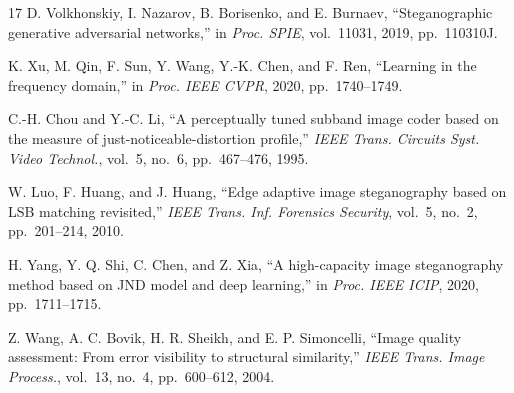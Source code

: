 \documentclass[conference]{IEEEtran}
\begin{document}
\begin{thebibliography}{17}
 D. Volkhonskiy, I. Nazarov, B. Borisenko, and E. Burnaev, ``Steganographic generative adversarial networks,'' in \textit{Proc. SPIE}, vol.~11031, 2019, pp.~110310J.

 K. Xu, M. Qin, F. Sun, Y. Wang, Y.-K. Chen, and F. Ren, ``Learning in the frequency domain,'' in \textit{Proc. IEEE CVPR}, 2020, pp.~1740--1749.

 C.-H. Chou and Y.-C. Li, ``A perceptually tuned subband image coder based on the measure of just-noticeable-distortion profile,'' \textit{IEEE Trans. Circuits Syst. Video Technol.}, vol.~5, no.~6, pp.~467--476, 1995.

 W. Luo, F. Huang, and J. Huang, ``Edge adaptive image steganography based on LSB matching revisited,'' \textit{IEEE Trans. Inf. Forensics Security}, vol.~5, no.~2, pp.~201--214, 2010.

 H. Yang, Y. Q. Shi, C. Chen, and Z. Xia, ``A high-capacity image steganography method based on JND model and deep learning,'' in \textit{Proc. IEEE ICIP}, 2020, pp.~1711--1715.

 Z. Wang, A. C. Bovik, H. R. Sheikh, and E. P. Simoncelli, ``Image quality assessment: From error visibility to structural similarity,'' \textit{IEEE Trans. Image Process.}, vol.~13, no.~4, pp.~600--612, 2004.

\end{thebibliography}
\end{document}
